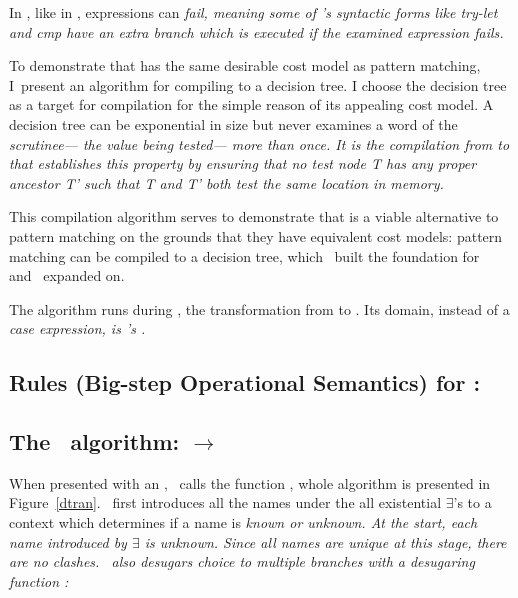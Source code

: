 \documentclass[manuscript,screen,review, 12pt, nonacm]{acmart}
\begin{document}
  In \D, like in \VMinus, expressions can \it{fail}, meaning some of \D's
  syntactic forms like \it{try-let} and \it{cmp} have an extra branch which is
  executed if the examined expression fails. 


    To demonstrate that \VMinus has the same desirable cost model as pattern
    matching, I~present an algorithm for compiling \VMinus to a decision tree. I
    choose the decision tree as a target for compilation for the simple reason
    of its appealing cost model. A decision tree can be exponential in size but
    never examines a word of the \it{scrutinee}--- the value being tested---
    more than once. It is the compilation from \VMinus to \D that establishes
    this property by ensuring that no \it{test} node \it{T} has any proper
    ancestor \it{T'} such that \it{T} and \it{T'} both test the same location in
    memory.   

    This compilation algorithm serves to demonstrate that \VMinus is a viable
    alternative to pattern matching on the grounds that they have equivalent
    cost models: pattern matching can be compiled to a decision tree,
    which~\citet{macqueen1985tree} built the foundation for and~\citet{maranget}
    expanded on. 

    The algorithm runs during \DTran, the transformation from \VMinus to \D. Its
    domain, instead of a \it{case} expression, is \VMinus's \iffibf. 
       


    \subsection{Rules (Big-step Operational Semantics) for \D:}
    \label{dsemantics}
    \dsemantics
    \subsection{The \DTran\ algorithm: \VMinus $\rightarrow$ \D}

    \algrenewcommand{}
    \algrenewcommand{}
    \algrenewcommand{}
    \newcommand\alet\algorithmicwhile
    \newcommand\ain\algorithmicdo
    \newcommand\aend\algorithmicend

    \newcommand\branches{\ensuremath{\mathit{branches}}}
    \newcommand\mg{\ensuremath{-}}


    When presented with an \iffibf, \DTran\ calls the function \Compile,
    whole algorithm is presented in Figure~\ref{dtran}. \DTran\ first introduces
    all the names under the all existential $\exists$'s to a context which
    determines if a name is \it{known} or \it{unknown}. At the start, each name
    introduced by $\exists$ is \it{unknown}. Since all names are unique at this
    stage, there are no clashes. \DTran\ also desugars choice to multiple
    \iffibf branches with a desugaring function \ITran: 
\end{document}
